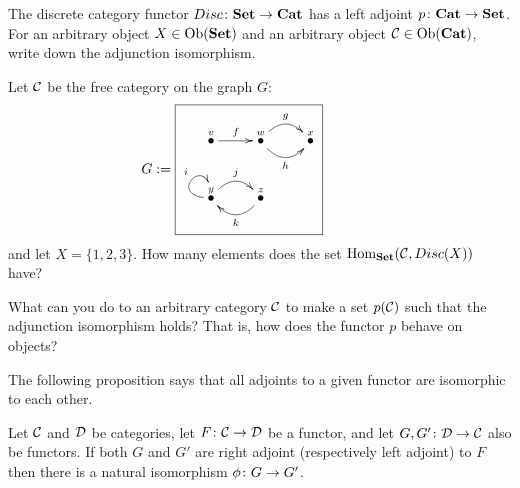 \documentclass[CT4S-EN-RU]{subfiles}
\begin{document}
\begin{exerciseRUS}
\end{exerciseRUS}

\begin{exerciseENG}
The discrete category functor $Disc\colon{\mathbf{Set}}\rightarrow{\mathbf{Cat}}$ has a left adjoint $p\colon{\mathbf{Cat}}\rightarrow{\mathbf{Set}}$. 
\sexc For an arbitrary object $X\in\textnormal{Ob}({\mathbf{Set}})$ and an arbitrary object $\mathcal{C}\in\textnormal{Ob}({\mathbf{Cat}})$, write down the adjunction isomorphism.
\item Let $\mathcal{C}$ be the free category on the graph $G$:
$$
G:=\parbox{2in}{\fbox{\xymatrix{\LMO{v}\ar[r]^f&\LMO{w}\ar@/_1pc/[r]_h\ar@/^1pc/[r]^g&\LMO{x}\\\LMO{y}\ar@(l,u)[]^i\ar@/^1pc/[r]^j&\LMO{z}\ar@/^1pc/[l]^k}}}
$$
and let $X=\{1,2,3\}$. How many elements does the set $\textnormal{Hom}_{\mathbf{Set}}(\mathcal{C},Disc(X))$ have?
\item What can you do to an arbitrary category $\mathcal{C}$ to make a set $p(\mathcal{C})$ such that the adjunction isomorphism holds? That is, how does the functor $p$ behave on objects?
\endsexc
\end{exerciseENG}

\begin{exerciseRUS}
\end{exerciseRUS}

\begin{blockENG}
The following proposition says that all adjoints to a given functor are isomorphic to each other. 
\end{blockENG}

\begin{blockRUS}
\end{blockRUS}

\begin{propositionENG}\label{prop:unicity of adjoints}
Let $\mathcal{C}$ and $\mathcal{D}$ be categories, let $F\colon\mathcal{C}\rightarrow\mathcal{D}$ be a functor, and let $G,G'\colon\mathcal{D}\rightarrow\mathcal{C}$ also be functors. If both $G$ and $G'$ are right adjoint (respectively left adjoint) to $F$ then there is a natural isomorphism $\phi\colon G\rightarrow G'$.
\end{propositionENG}

\begin{propositionRUS}\label{prop:unicity of adjoints}
\end{propositionRUS}
\end{document}
